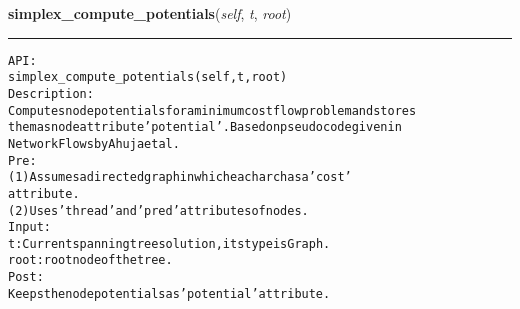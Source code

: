     \label{coinor:gimpy:graph:Graph:simplex_compute_potentials}

    \vspace{0.5ex}

\hspace{.8\funcindent}\begin{boxedminipage}{\funcwidth}

    \raggedright \textbf{simplex\_compute\_potentials}(\textit{self}, \textit{t}, \textit{root})

    \vspace{-1.5ex}

    \rule{\textwidth}{0.5\fboxrule}
\setlength{\parskip}{2ex}
\begin{alltt}

API:
    simplex\_compute\_potentials(self, t, root)
Description:
    Computes node potentials for a minimum cost flow problem and stores
    them as node attribute 'potential'. Based on pseudocode given in
    Network Flows by Ahuja et al.
Pre:
    (1) Assumes a directed graph in which each arc has a 'cost'
    attribute.
    (2) Uses 'thread' and 'pred' attributes of nodes.
Input:
    t: Current spanning tree solution, its type is Graph.
    root: root node of the tree.
Post:
    Keeps the node potentials as 'potential' attribute.
\end{alltt}

\setlength{\parskip}{1ex}
    \end{boxedminipage}

    \label{coinor:gimpy:graph:Graph:simplex_connect}

    \vspace{0.5ex}

